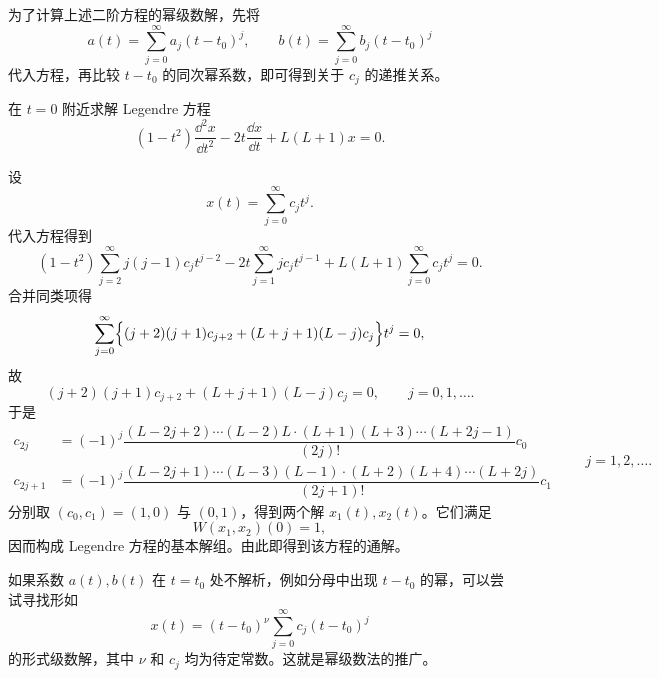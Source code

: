 为了计算上述二阶方程的幂级数解，先将
\[
	a(t)=\sum_{j=0}^{\infty}a_j(t-t_0)^j,
	\qquad
	b(t)=\sum_{j=0}^{\infty}b_j(t-t_0)^j
\]
代入方程，再比较 $t-t_0$ 的同次幂系数，即可得到关于 $c_j$ 的递推关系。

\begin{example}\label{ex:Legendre方程的幂级数解}
	在 $t=0$ 附近求解 Legendre 方程
	\[
		(1-t^2)\dfrac{\dd^2x}{\dd t^2}
		-2t\dfrac{\dd x}{\dd t}+L(L+1)x=0.
	\]

	\begin{solution}
		设
		\[
			x(t)=\sum_{j=0}^{\infty}c_jt^j.
		\]
		代入方程得到
		\[
			(1-t^2)\sum_{j=2}^{\infty}j(j-1)c_jt^{j-2}
			-2t\sum_{j=1}^{\infty}jc_jt^{j-1}
			+L(L+1)\sum_{j=0}^{\infty}c_jt^j=0.
		\]
		合并同类项得
		\[
			\sum_{j=0}^{\infty}
			\Bigl\{(j+2)(j+1)c_{j+2}
			+(L+j+1)(L-j)c_j\Bigr\}t^j=0,
		\]
		故
		\[
			(j+2)(j+1)c_{j+2}
			+(L+j+1)(L-j)c_j=0,
			\qquad j=0,1,\ldots.
		\]
		于是
		\[
		\begin{aligned}
			c_{2j}
			&=(-1)^j
			\dfrac{(L-2j+2)\cdots(L-2)L\cdot(L+1)(L+3)\cdots(L+2j-1)}{(2j)!}c_0\\
			c_{2j+1}
			&=(-1)^j
			\dfrac{(L-2j+1)\cdots(L-3)(L-1)\cdot(L+2)(L+4)\cdots(L+2j)}{(2j+1)!}c_1
		\end{aligned}
		\qquad j=1,2,\ldots.
		\]
		分别取 $(c_0,c_1)=(1,0)$ 与 $(0,1)$，得到两个解
		$x_1(t),x_2(t)$。它们满足
		\[
			W(x_1,x_2)(0)=1,
		\]
		因而构成 Legendre 方程的基本解组。由此即得到该方程的通解。
	\end{solution}
\end{example}

如果系数 $a(t),b(t)$ 在 $t=t_0$ 处不解析，例如分母中出现
$t-t_0$ 的幂，可以尝试寻找形如
\[
	x(t)=(t-t_0)^{\nu}\sum_{j=0}^{\infty}c_j(t-t_0)^j
\]
的形式级数解，其中 $\nu$ 和 $c_j$ 均为待定常数。这就是幂级数法的推广。

